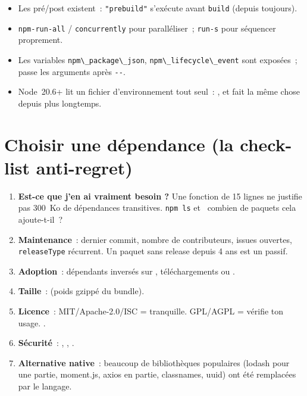 \begin{itemize}
  \item Les pr\'e/post existent~: \verb|"prebuild"| s'ex\'ecute avant \verb|build| (depuis toujours).
  \item \verb|npm-run-all| / \verb|concurrently| pour parall\'eliser~; \verb|run-s| pour s\'equencer proprement.
  \item Les variables \verb|npm\_package\_json|, \verb|npm\_lifecycle\_event| sont expos\'ees~;
         passe les arguments apr\`es \verb|--|.
  \item Node~20.6+ lit un fichier d'environnement tout seul~: ,
        et  fait la m\^eme chose depuis plus longtemps.
        \label{sec-dotenv}
\end{itemize}

\section{Choisir une d\'ependance (la check-list anti-regret)}

\begin{enumerate}
  \item \textbf{Est-ce que j'en ai vraiment besoin ?} Une fonction de 15 lignes ne justifie pas
        300~Ko de d\'ependances transitives. \verb|npm ls| et \og ~combien de paquets cela ajoute-t-il~?~ \fg{}
  \item \textbf{Maintenance}~: dernier commit, nombre de contributeurs, issues ouvertes,
        \verb|releaseType| r\'ecurrent. Un paquet sans release depuis 4 ans est un passif.
  \item \textbf{Adoption}~: d\'ependants invers\'es sur ,
        t\'el\'echargements  ou .
  \item \textbf{Taille}~:  (poids gzipp\'e du bundle).
  \item \textbf{Licence}~: MIT/Apache-2.0/ISC = tranquille. GPL/AGPL = v\'erifie ton usage.
        .
  \item \textbf{S\'ecurit\'e}~: , ,
        .
  \item \textbf{Alternative native}~: beaucoup de biblioth\`eques populaires (lodash pour une
        partie, moment.js, axios en partie, classnames, uuid) ont \'et\'e remplac\'ees par le langage.
\end{enumerate}

